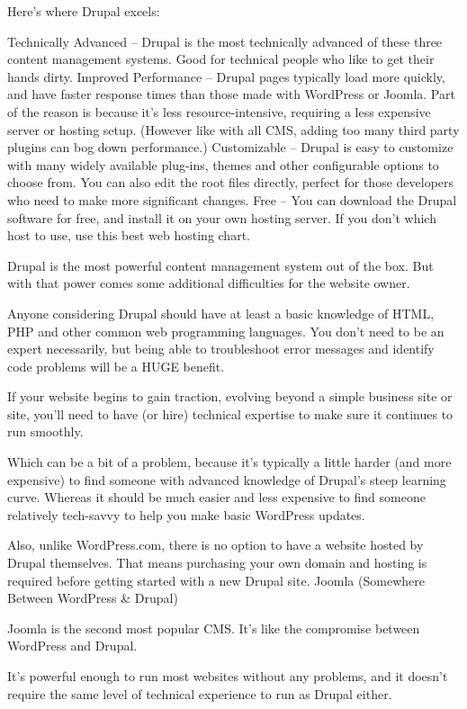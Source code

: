 \documentclass[12pt]{report}
\begin{document}
\begin{itemize}
Here’s where Drupal excels:

    Technically Advanced – Drupal is the most technically advanced of these three content management systems. Good for technical people who like to get their hands dirty.
    Improved Performance – Drupal pages typically load more quickly, and have faster response times than those made with WordPress or Joomla. Part of the reason is because it’s less resource-intensive, requiring a less expensive server or hosting setup. (However like with all CMS, adding too many third party plugins can bog down performance.)
    Customizable – Drupal is easy to customize with many widely available plug-ins, themes and other configurable options to choose from. You can also edit the root files directly, perfect for those developers who need to make more significant changes.
    Free – You can download the Drupal software for free, and install it on your own hosting server. If you don’t which host to use, use this best web hosting chart.

Drupal is the most powerful content management system out of the box. But with that power comes some additional difficulties for the website owner.

Anyone considering Drupal should have at least a basic knowledge of HTML, PHP and other common web programming languages. You don’t need to be an expert necessarily, but being able to troubleshoot error messages and identify code problems will be a HUGE benefit.

If your website begins to gain traction, evolving beyond a simple business site or site, you’ll need to have (or hire) technical expertise to make sure it continues to run smoothly.

Which can be a bit of a problem, because it’s typically a little harder (and more expensive) to find someone with advanced knowledge of Drupal’s steep learning curve. Whereas it should be much easier and less expensive to find someone relatively tech-savvy to help you make basic WordPress updates.

Also, unlike WordPress.com, there is no option to have a website hosted by Drupal themselves. That means purchasing your own domain and hosting is required before getting started with a new Drupal site.
  Joomla (Somewhere Between WordPress & Drupal)

Joomla is the second most popular CMS. It’s like the compromise between WordPress and Drupal.

It’s powerful enough to run most websites without any problems, and it doesn’t require the same level of technical experience to run as Drupal either.


\end{itemize}
\end{document}
